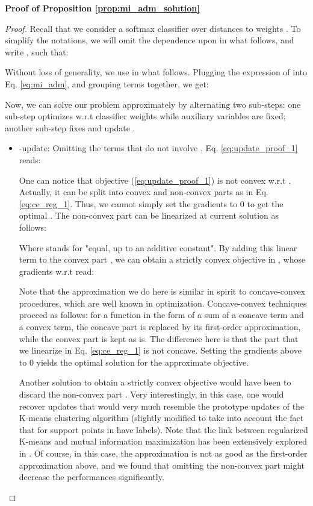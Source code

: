 \documentclass{article}
\begin{document}
    
    
	\textbf{Proof of Proposition \ref{prop:mi_adm_solution}}
    	\begin{proof}
            Recall that we consider a softmax classifier over distances to weights . To simplify the notations, we will omit the dependence upon  in what follows, and write , such that:
            
            Without loss of generality, we use  in what follows. Plugging the expression of  into Eq. \eqref{eq:mi_adm}, and grouping terms together, we get:
            
            Now, we can solve our problem approximately by alternating two sub-steps: 
            one sub-step optimizes w.r.t classifier weights  while auxiliary variables  are fixed; another sub-step fixes  and update .
            \begin{itemize}
                \item -update: Omitting the terms that do not involve , Eq. \eqref{eq:update_proof_1} reads:
    		        
    		        One can notice that objective (\ref{eq:update_proof_1}) is not convex w.r.t . Actually, it can be split into convex and non-convex parts as in Eq. \eqref{eq:ce_reg_1}. Thus, we cannot simply set the gradients to 0 to get the optimal . The non-convex part can be linearized at current solution  as follows:
    		        
    		       Where  stands for "equal, up to an additive constant". By adding this linear term to the convex part , we can obtain a strictly convex objective in , whose gradients w.r.t  read:
    		        
    		        Note that the approximation we do here is similar in spirit to concave-convex procedures, which are well known in optimization. Concave-convex techniques proceed as follows: for a function in the form of a sum of a concave term and a convex term, the concave part is replaced by its first-order approximation, while the convex part is kept as is. The difference here is that the part that we linearize in Eq. \eqref{eq:ce_reg_1} is not concave. 
    		        Setting the gradients above to 0 yields the optimal solution for the approximate objective. 
    		        
    		        Another solution to obtain a strictly convex objective would have been to discard the non-convex part . Very interestingly, in this case, one would recover  updates that would very much resemble the prototype updates of the K-means clustering algorithm (slightly modified to take into account the fact that for support points in  have labels). Note that the link between regularized K-means and mutual information maximization has been extensively explored in \cite{jabi}. Of course, in this case, the approximation is not as good as the first-order approximation above, and we found that omitting the non-convex part might decrease the performances significantly. 


\end{itemize}
\end{proof}
\end{document}
